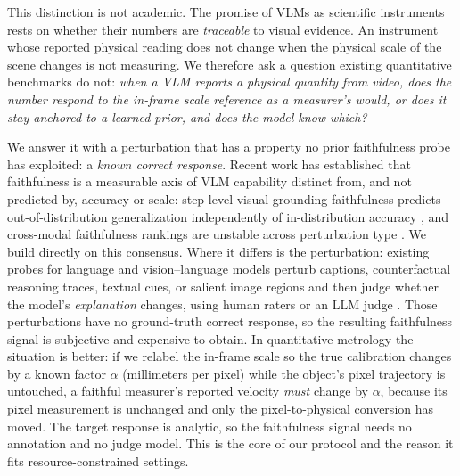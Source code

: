 \documentclass[11pt]{article}
\begin{document}
This distinction is not academic. The promise of VLMs as scientific instruments
rests on whether their numbers are \emph{traceable} to visual evidence. An
instrument whose reported physical reading does not change when the physical
scale of the scene changes is not measuring. We therefore ask a question existing
quantitative benchmarks do not:
\emph{when a VLM reports a physical quantity from video, does the number respond
to the in-frame scale reference as a measurer's would, or does it stay anchored
to a learned prior, and does the model know which?}

We answer it with a perturbation that has a property no prior faithfulness probe
has exploited: a \emph{known correct response}. Recent work has established that
faithfulness is a measurable axis of VLM capability distinct from, and not
predicted by, accuracy or scale: step-level visual grounding faithfulness
predicts out-of-distribution generalization independently of in-distribution
accuracy \citep{stepground2026}, and cross-modal faithfulness rankings are
unstable across perturbation type \citep{crossmodal2026}. We build directly on
this consensus. Where it differs is the perturbation: existing probes for
language and vision--language models perturb captions, counterfactual reasoning
traces, textual cues, or salient image regions and then judge whether the
model's \emph{explanation} changes, using human raters or an LLM judge
\citep{lanham2023faithfulness,turpin2023language,medfaith2025,rlvlm2026,visualthink2025,stepground2026}.
Those perturbations have no ground-truth correct response, so the resulting
faithfulness signal is subjective and expensive to obtain. In quantitative
metrology the situation is better: if we relabel the in-frame scale so the true
calibration changes by a known factor $\alpha$ (millimeters per pixel) while the
object's pixel trajectory is untouched, a faithful measurer's reported velocity
\emph{must} change by $\alpha$, because its pixel measurement is unchanged and
only the pixel-to-physical conversion has moved. The target response is analytic,
so the faithfulness signal needs no annotation and no judge model. This is the
core of our protocol and the reason it fits resource-constrained settings.
\end{document}
